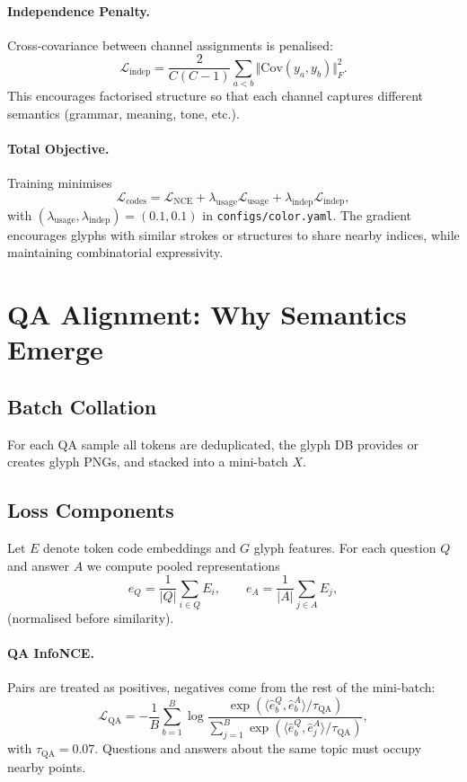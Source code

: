 \documentclass[11pt]{article}
\begin{document}
\paragraph{Independence Penalty.}
Cross-covariance between channel assignments is penalised:
\begin{equation}
    \mathcal{L}_{\text{indep}} = \frac{2}{C(C-1)}\sum_{a<b} \Vert \mathrm{Cov}(y_a, y_b)\Vert_F^2.
\end{equation}
This encourages factorised structure so that each channel captures different semantics (grammar, meaning, tone, etc.).

\paragraph{Total Objective.}
Training minimises
\begin{equation}
    \mathcal{L}_{\text{codes}} = \mathcal{L}_{\text{NCE}} + \lambda_{\text{usage}}\mathcal{L}_{\text{usage}} + \lambda_{\text{indep}}\mathcal{L}_{\text{indep}},
\end{equation}
with $(\lambda_{\text{usage}}, \lambda_{\text{indep}})=(0.1,0.1)$ in \texttt{configs/color.yaml}. The gradient encourages glyphs with similar strokes or structures to share nearby indices, while maintaining combinatorial expressivity.

\section{QA Alignment: Why Semantics Emerge}
\subsection{Batch Collation}
For each QA sample all tokens are deduplicated, the glyph DB provides or creates glyph PNGs, and stacked into a mini-batch $X$.

\subsection{Loss Components}
Let $E$ denote token code embeddings and $G$ glyph features. For each question $Q$ and answer $A$ we compute pooled representations
\begin{equation}
    e_Q = \frac{1}{|Q|}\sum_{i\in Q} E_i, \qquad e_A = \frac{1}{|A|}\sum_{j\in A} E_j,
\end{equation}
(normalised before similarity).

\paragraph{QA InfoNCE.}
Pairs are treated as positives, negatives come from the rest of the mini-batch:
\begin{equation}
    \mathcal{L}_{\text{QA}} = -\frac{1}{B}\sum_{b=1}^B \log \frac{\exp(\langle \hat{e}^Q_b, \hat{e}^A_b\rangle / \tau_{\text{QA}})}{\sum_{j=1}^B \exp(\langle \hat{e}^Q_b, \hat{e}^A_j\rangle / \tau_{\text{QA}})},
\end{equation}
with $\tau_{\text{QA}}=0.07$. Questions and answers about the same topic must occupy nearby points.
\end{document}

